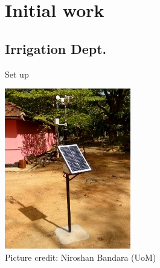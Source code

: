 \documentclass[xcolor=dvipsnames,beamer,unknownkeysallowed]{beamer} %
\begin{document}
\section{Initial work}
\subsection{Irrigation Dept.}
\begin{frame}[fragile]{Set up}

\begin{center}
 \includegraphics[width=5.5cm]{IMG_20140902_151739}\\
\vspace{5mm}
Picture credit: Niroshan Bandara (UoM)
\end{center}

\end{frame}
\end{document}
